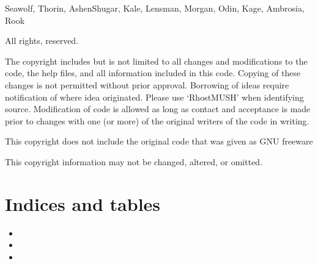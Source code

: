 \documentclass[letterpaper,10pt,english]{sphinxmanual}
\begin{document}
\sphinxAtStartPar
Seawolf, Thorin, Ashen\sphinxhyphen{}Shugar, Kale, Lensman, Morgan, Odin, Kage, Ambrosia, Rook

\sphinxAtStartPar
All rights, reserved.

\sphinxAtStartPar
The copyright includes but is not limited to all changes and modifications to
the code, the help files, and all information included in this code.
Copying of these changes is not permitted without prior approval.
Borrowing of ideas require notification of where idea originated.
Please use ‘RhostMUSH’ when identifying source. Modification of code is allowed
as long as contact and acceptance is made prior to changes with one (or more) of
the original writers of the code in writing.

\sphinxAtStartPar
This copyright does not include the original code that was given as GNU freeware

\sphinxAtStartPar
This copyright information may not be changed, altered, or omitted.


\section{Indices and tables}
\label{\detokenize{index:indices-and-tables}}\begin{itemize}
\item {} 
\sphinxAtStartPar
{}

\item {} 
\sphinxAtStartPar
{}

\item {} 
\sphinxAtStartPar
{}

\end{itemize}



\renewcommand{\indexname}{Index}
\printindex
\end{document}
